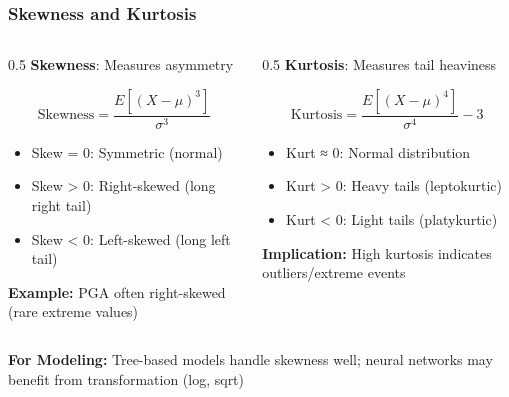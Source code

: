 \documentclass[aspectratio=169]{beamer}
\begin{document}
\begin{frame}
\frametitle{Skewness and Kurtosis}

\begin{columns}[T]
    \begin{column}{0.5\textwidth}
        \textbf{Skewness}: Measures asymmetry

        \begin{equation*}
        \text{Skewness} = \frac{E[(X-\mu)^3]}{\sigma^3}
        \end{equation*}

        \begin{itemize}
            \item Skew = 0: Symmetric (normal)
            \item Skew > 0: Right-skewed (long right tail)
            \item Skew < 0: Left-skewed (long left tail)
        \end{itemize}

        \vspace{0.3cm}

        \textbf{Example:} PGA often right-skewed (rare extreme values)
    \end{column}
    \begin{column}{0.5\textwidth}
        \textbf{Kurtosis}: Measures tail heaviness

        \begin{equation*}
        \text{Kurtosis} = \frac{E[(X-\mu)^4]}{\sigma^4} - 3
        \end{equation*}

        \begin{itemize}
            \item Kurt ≈ 0: Normal distribution
            \item Kurt > 0: Heavy tails (leptokurtic)
            \item Kurt < 0: Light tails (platykurtic)
        \end{itemize}

        \vspace{0.3cm}

        \textbf{Implication:} High kurtosis indicates outliers/extreme events
    \end{column}
\end{columns}

\vspace{0.5cm}

\textbf{For Modeling:} Tree-based models handle skewness well; neural networks may benefit from transformation (log, sqrt)

\end{frame}
\end{document}
